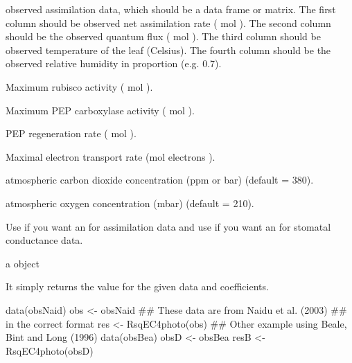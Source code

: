\documentclass[letterpaper]{book}
\begin{document}
\begin{Arguments}
\begin{ldescription}
\item[\code{obsDat}] observed assimilation data, which should be
a data frame or matrix.  The first column should be
observed net assimilation rate (\eqn{\mu}{} mol
 ).  The second column should be
the observed quantum flux (\eqn{\mu}{} mol 
).  The third column should be observed
temperature of the leaf (Celsius).  The fourth column
should be the observed relative humidity in proportion
(e.g. 0.7).

\item[\code{iVcmax}] Maximum rubisco activity (\eqn{\mu}{} mol
 ).

\item[\code{iVpmax}] Maximum PEP carboxylase activity (\eqn{\mu}{}
mol  ).

\item[\code{iVpr}] PEP regeneration rate (\eqn{\mu}{} mol
 ).

\item[\code{iJmax}] Maximal electron transport rate
(\eqn{\mu}{}mol electrons  ).

\item[\code{co2}] atmospheric carbon dioxide concentration (ppm
or \eqn{\mu}{}bar) (default = 380).

\item[\code{o2}] atmospheric oxygen concentration (mbar)
(default = 210).

\item[\code{type}] Use  if you want an 
for assimilation data and use  if you
want an  for stomatal conductance data.
\end{ldescription}
\end{Arguments}
%
\begin{Value}
a  object

It simply returns the  value for the given data
and coefficients.
\end{Value}
%
\begin{Examples}
\begin{ExampleCode}
data(obsNaid)
obs <- obsNaid
## These data are from Naidu et al. (2003)
## in the correct format
res <- RsqEC4photo(obs)
## Other example using Beale, Bint and Long (1996)
data(obsBea)
obsD <- obsBea
resB <- RsqEC4photo(obsD)
\end{ExampleCode}
\end{Examples}
\end{document}
